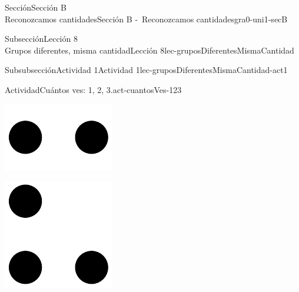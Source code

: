 \begin{sectionptx}{Sección}{{\Large Sección B\\}Reconozcamos cantidades}{}{Sección B -~Reconozcamos cantidades}{}{}{gra0-uni1-secB}
\begin{subsectionptx}{Subsección}{{\normalsize Lección 8\\[-0.05cm]}Grupos diferentes, misma cantidad}{}{Lección 8}{}{}{lec-gruposDiferentesMismaCantidad}
\begin{subsubsectionptx}{Subsubsección}{Actividad 1}{}{Actividad 1}{}{}{lec-gruposDiferentesMismaCantidad-act1}
\begin{activity}{Actividad}{Cuántos ves: 1, 2, 3.}{act-cuantosVes-123}
\begin{sidebyside}{3}{0.0416666666666667}{0.0416666666666667}{0.0833333333333333}
\begin{sbspanel}{0.25}
\end{sbspanel}%
\begin{sbspanel}{0.25}%
\includegraphics[max width=\linewidth, center]{external/svg-source/tikz-file-136323.pdf}
\end{sbspanel}%
\begin{sbspanel}{0.25}%
\includegraphics[max width=\linewidth, center]{external/svg-source/tikz-file-136324.pdf}
\end{sbspanel}%
\end{sidebyside}%
\end{activity}%
\end{subsubsectionptx}

\end{subsectionptx}
\end{sectionptx}
